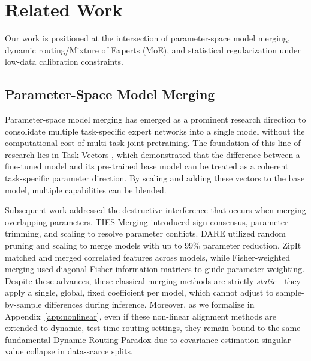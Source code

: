 \section{Related Work}
\label{sec:related_work}

Our work is positioned at the intersection of parameter-space model merging, dynamic routing/Mixture of Experts (MoE), and statistical regularization under low-data calibration constraints. 

\subsection{Parameter-Space Model Merging}
Parameter-space model merging has emerged as a prominent research direction to consolidate multiple task-specific expert networks into a single model without the computational cost of multi-task joint pretraining. The foundation of this line of research lies in Task Vectors \cite{ilharco2022editing}, which demonstrated that the difference between a fine-tuned model and its pre-trained base model can be treated as a coherent task-specific parameter direction. By scaling and adding these vectors to the base model, multiple capabilities can be blended. 

Subsequent work addressed the destructive interference that occurs when merging overlapping parameters. TIES-Merging \cite{yadav2023ties} introduced sign consensus, parameter trimming, and scaling to resolve parameter conflicts. DARE \cite{yu2024dare} utilized random pruning and scaling to merge models with up to 99\% parameter reduction. ZipIt \cite{stoica2023zip} matched and merged correlated features across models, while Fisher-weighted merging \cite{matena2022merging} used diagonal Fisher information matrices to guide parameter weighting. Despite these advances, these classical merging methods are strictly \emph{static}—they apply a single, global, fixed coefficient per model, which cannot adjust to sample-by-sample differences during inference. Moreover, as we formalize in Appendix~\ref{app:nonlinear}, even if these non-linear alignment methods are extended to dynamic, test-time routing settings, they remain bound to the same fundamental Dynamic Routing Paradox due to covariance estimation singular-value collapse in data-scarce splits.

